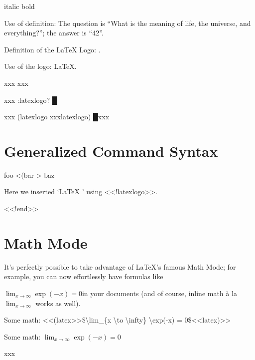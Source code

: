 
\begin{multicols}{2}{\mktsStyleItalic{}italic\/}
{\mktsStyleBold{}bold}\mktsShowpar\par
Use of definition: The question is “{\mktsStyleItalic{}What is the meaning of life,
the universe, and everything?\/}”; the
answer is “{\mktsStyleBold{}42}”.\mktsShowpar\par
\end{multicols}Definition of the LaTeX Logo:
.\mktsShowpar\par
Use of the logo: \LaTeX{}.\mktsShowpar\par
xxx 
xxx\mktsShowpar\par
xxx {\mktsStyleBold\color{violet}{\mktsStyleSymbol}:latexlogo? {\mktsStyleSymbol█}}\mktsShowpar\par
xxx {\mktsStyleBold\color{violet}{\mktsStyleSymbol█}(latexlogo {\mktsStyleSymbol}}xxx{\mktsStyleBold\color{violet}{\mktsStyleSymbol}latexlogo) {\mktsStyleSymbol█}}xxx\mktsShowpar\par

\section{Generalized Command Syntax
}
foo <{\mktsStyleBold\color{violet}{\mktsStyleSymbol█}(bar {\mktsStyleSymbol}}> baz\mktsShowpar\par
Here we inserted ‘\LaTeX{}
’ using {\mktsStyleCode{}<<!latexlogo>>}.\mktsShowpar\par
{\mktsStyleCode{}<<!end>>}\mktsShowpar\par
\begin{multicols}{2}\end{multicols}
\section{Math Mode
}
\begin{multicols}{2}It’s perfectly possible to take advantage of
\LaTeX{}'s famous Math Mode; for example,
you can now effortlessly have formulas like\mktsShowpar\par
$\lim_{x \to \infty} \exp(-x) = 0$in your documents (and of course, inline math {\mktsStyleItalic{}à la\/}
$\lim_{x \to \infty}$ works as well).\mktsShowpar\par
\end{multicols}Some math: {\mktsStyleCode{}<<(latex>>\$\textbackslash{}lim\_\{x \textbackslash{}to \textbackslash{}infty\} \textbackslash{}exp(-x) = 0\$<<latex)>>}\mktsShowpar\par
Some math: $\lim_{x \to \infty} \exp(-x) = 0$\mktsShowpar\par
xxx\mktsShowpar\par

